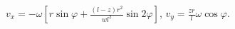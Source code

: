 $v_x = -\omega[r\sin{\varphi} + \frac{(l - z)r^2}{wl^2}\sin{2\varphi}]$,
$v_y = \frac{zr}{l}\omega\cos{\varphi}$.
